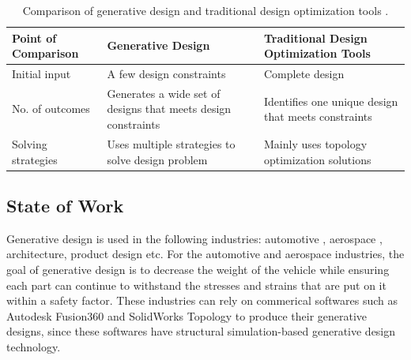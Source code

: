 \documentclass[letterpaper,11pt]{article}
\begin{document}
\begin{table}[h]
        \caption{Comparison of generative design and traditional design optimization tools
        \cite{autodesk_fusion_2020}.}
        \label{tab:compare}
        \centering
        \doublespacing
        \small
        \begin{tabular}{p{3.7cm}|p{5.5cm}p{6cm}}
        \hline
        \textbf{Point of Comparison} & \textbf{Generative Design} & \textbf{Traditional Design Optimization Tools}  \\ \hline
        Initial input & A few design constraints & Complete design \\ 
        No. of outcomes & Generates a wide set of designs that meets design constraints & Identifies one unique design that meets constraints \\   
        Solving strategies & Uses multiple strategies to solve design problem & Mainly uses topology optimization solutions \\ \hline
        \end{tabular}
\end{table}


\subsection{State of Work}
Generative design is used in the following industries: 
automotive \cite{deplazes_autodesk_2019}, aerospace \cite{byrne_evolving_2014},
architecture, product design etc. 
For the automotive and aerospace industries, the goal of generative 
design is to decrease 
the weight of the vehicle while ensuring each part can continue to 
withstand the stresses and strains that are put on it within a 
safety factor. 
These industries can rely on commerical softwares such as 
Autodesk Fusion360 \cite{autodesk_autodesk_2020} and  
SolidWorks Topology \cite{lombard_solidworks_2008}
to produce their generative designs, since these softwares have 
structural simulation-based generative design technology.  
\end{document}
